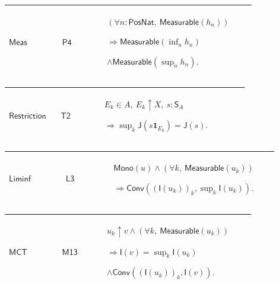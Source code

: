 \documentclass[12pt,reqno]{amsart}
\theoremstyle{blueplain}
\numberwithin{equation}{section}
\begin{document}
{\scriptsize \setlength{\parskip}{0pt}\nointerlineskip
\noindent 
\begin{tabular}{|@{}>{\centering\arraybackslash}m{0.19251\linewidth}|>{\centering\arraybackslash}m{0.16845\linewidth}|>{\centering\arraybackslash}m{0.53904\linewidth}|}
\hline
\hypertarget{lem:Meas}{$\displaystyle \mathsf{Meas}$} & \hyperlink{proof:P4}{%
$\displaystyle \mathsf{P4}$} & $\displaystyle (\forall n:\mathsf{PosNat},\ 
\mathsf{Measurable}(h_n))$\par$\displaystyle \Rightarrow\mathsf{Measurable}%
(\inf_n h_n)$\par$\displaystyle \land\mathsf{Measurable}(\sup_n h_n).$ \\ 
\hline
\end{tabular}%
}

{\scriptsize \setlength{\parskip}{0pt}\nointerlineskip
\noindent 
\begin{tabular}{|@{}>{\centering\arraybackslash}m{0.19251\linewidth}|>{\centering\arraybackslash}m{0.16845\linewidth}|>{\centering\arraybackslash}m{0.53904\linewidth}|}
\hline
\hypertarget{lem:Restriction}{$\displaystyle \mathsf{Restriction}$} & 
\hyperlink{proof:T2}{$\displaystyle \mathsf{T2}$} & $\displaystyle E_k\in
A,\ E_k\uparrow X,\ s:\mathsf{S}_A$\par$\displaystyle \Rightarrow\sup_k%
\mathsf{J}(s\mathbf{1}_{E_k})=\mathsf{J}(s).$ \\ \hline
\end{tabular}%
}

{\scriptsize \setlength{\parskip}{0pt}\nointerlineskip
\noindent 
\begin{tabular}{|@{}>{\centering\arraybackslash}m{0.19251\linewidth}|>{\centering\arraybackslash}m{0.16845\linewidth}|>{\centering\arraybackslash}m{0.53904\linewidth}|}
\hline
\hypertarget{lem:Liminf}{$\displaystyle \mathsf{Liminf}$} & \hyperlink{proof:L3}%
{$\displaystyle \mathsf{L3}$} & $\displaystyle \mathsf{Mono}(u)\land(\forall
k,\ \mathsf{Measurable}(u_k))$\par$\displaystyle \Rightarrow\mathsf{Conv}((%
\mathsf{I}(u_k))_k,\sup_k\mathsf{I}(u_k)).$ \\ \hline
\end{tabular}%
}

{\scriptsize \setlength{\parskip}{0pt}\nointerlineskip
\noindent 
\begin{tabular}{|@{}>{\centering\arraybackslash}m{0.19251\linewidth}|>{\centering\arraybackslash}m{0.16845\linewidth}|>{\centering\arraybackslash}m{0.53904\linewidth}|}
\hline
\hypertarget{lem:MCT}{$\displaystyle \mathsf{MCT}$} & \hyperlink{proof:M13}{$%
\displaystyle \mathsf{M13}$} & $\displaystyle u_k\uparrow v\land(\forall k,\ 
\mathsf{Measurable}(u_k))$\par$\displaystyle \Rightarrow\mathsf{I}(v)=\sup_k%
\mathsf{I}(u_k)$\par$\displaystyle \land\mathsf{Conv}((\mathsf{I}(u_k))_k,%
\mathsf{I}(v)).$ \\ \hline
\end{tabular}%
}
\end{document}
